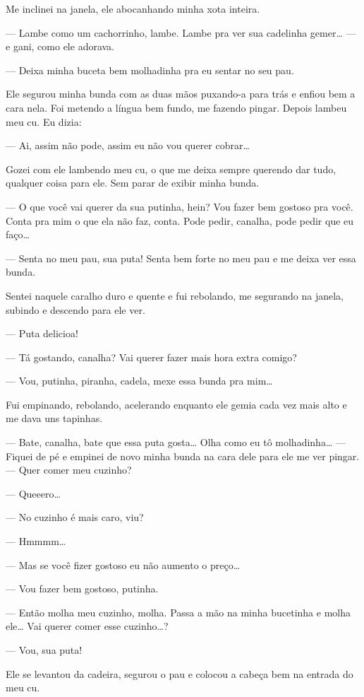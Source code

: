 Me inclinei na janela, ele abocanhando minha xota inteira.

--- Lambe como um cachorrinho, lambe. Lambe pra ver sua cadelinha
gemer… --- e gani, como ele adorava.

--- Deixa minha buceta bem molhadinha pra eu sentar no seu pau.

Ele segurou minha bunda com as duas mãos puxando-a para trás e enfiou
bem a cara nela. Foi metendo a língua bem fundo, me fazendo pingar.
Depois lambeu meu cu. Eu dizia:

--- Ai, assim não pode, assim eu não vou querer cobrar…

Gozei com ele lambendo meu cu, o que me deixa sempre querendo dar tudo,
qualquer coisa para ele. Sem parar de exibir minha bunda.

--- O que você vai querer da sua putinha, hein? Vou fazer bem gostoso
pra você. Conta pra mim o que ela não faz, conta. Pode pedir, canalha,
pode pedir que eu faço…

--- Senta no meu pau, sua puta! Senta bem forte no meu pau e me deixa
ver essa bunda.

Sentei naquele caralho duro e quente e fui rebolando, me segurando na
janela, subindo e descendo para ele ver.

--- Puta delicioa!

--- Tá gostando, canalha? Vai querer fazer mais hora extra comigo?

--- Vou, putinha, piranha, cadela, mexe essa bunda pra mim…

Fui empinando, rebolando, acelerando enquanto ele gemia cada vez mais
alto e me dava uns tapinhas.

--- Bate, canalha, bate que essa puta gosta… Olha como eu tô
molhadinha… --- Fiquei de pé e empinei de novo minha bunda na
cara dele para ele me ver pingar. --- Quer comer meu cuzinho?

--- Queeero…

--- No cuzinho é mais caro, viu?

--- Hmmmm…

--- Mas se você fizer gostoso eu não aumento o preço…

--- Vou fazer bem gostoso, putinha.

--- Então molha meu cuzinho, molha. Passa a mão na minha bucetinha e
molha ele… Vai querer comer esse cuzinho…?

--- Vou, sua puta!

Ele se levantou da cadeira, segurou o pau e colocou a cabeça bem na
entrada do meu cu.

